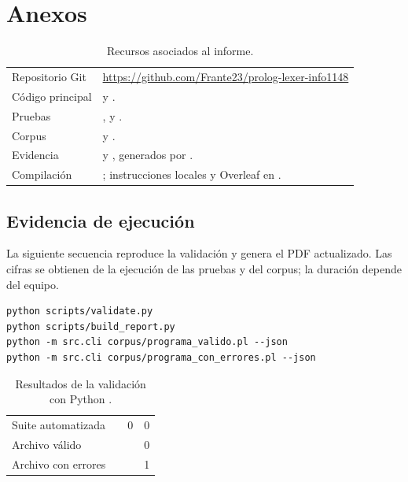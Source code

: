 \section{Anexos}

\begin{table}[H]
\centering
\small
\caption{Recursos asociados al informe.}
\label{tab:recursos}
\begin{tabularx}{\textwidth}{L{4cm}Y}
\toprule
{} &  \\
\midrule
Repositorio Git & \url{https://github.com/Frante23/prolog-lexer-info1148} \\
 Código principal &  y . \\
Pruebas & ,  y . \\
 Corpus &  y . \\
Evidencia &  y , generados por . \\
 Compilación & ; instrucciones locales y Overleaf en . \\
\bottomrule
\end{tabularx}
\end{table}

\subsection{Evidencia de ejecución}

La siguiente secuencia reproduce la validación y genera el PDF actualizado. Las cifras se obtienen de la ejecución de las pruebas y del corpus; la duración depende del equipo.

\begin{lstlisting}[style=terminal]
python scripts/validate.py
python scripts/build_report.py
python -m src.cli corpus/programa_valido.pl --json
python -m src.cli corpus/programa_con_errores.pl --json
\end{lstlisting}

\begin{table}[H]
\centering
\small
\caption{Resultados de la validación con Python \PythonValidacion{}.}
\begin{tabularx}{\textwidth}{Y C{2cm} C{2cm} C{2cm}}
\toprule
{} &  &  &  \\
\midrule
Suite automatizada & \PruebasTotal{} & 0 & 0 \\
 Archivo válido & \TokensValidos{} & \ErroresValidos{} & 0 \\
Archivo con errores & \TokensInvalidos{} & \ErroresInvalidos{} & 1 \\
\bottomrule
\end{tabularx}
\end{table}


